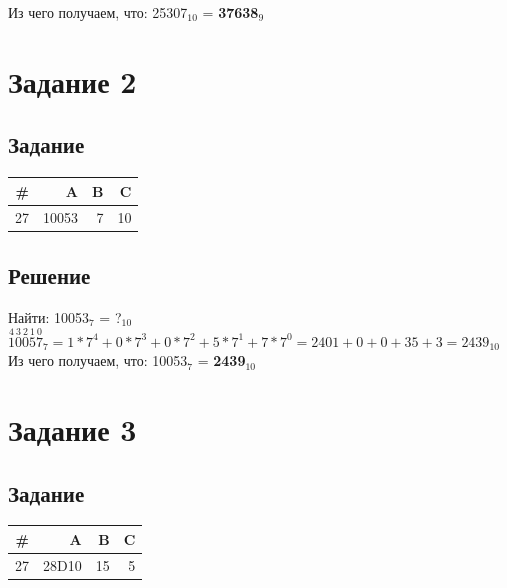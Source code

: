 \documentclass[11pt]{article}
\begin{document}
Из чего получаем, что: 25307\(_{\text{10}}\) = \textbf{37638\(_{\text{9}}\)}

\section{Задание 2}
\label{sec:orgbf80c82}
\subsection{Задание}
\label{sec:orgf47a5b9}
\begin{center}
\begin{tabular}{|r|rrr|}
\hline
\# & A & B & C\\
\hline
27 & 10053 & 7 & 10\\
\hline
\end{tabular}
\end{center}

\subsection{Решение}
\label{sec:org7e3779d}
Найти: 10053\(_{\text{7}}\) = ?\(_{\text{10}}\) \\
\(\overset{4}{1}\overset{3}{0}\overset{2}{0}\overset{1}{5}\overset{0}{7}_7 =
1 * 7^4 + 0 * 7^3 + 0 * 7^2 + 5 * 7^1 + 7 * 7^0 =
2401 + 0 + 0 + 35 + 3 =
2439_{10}\)
Из чего получаем, что: 10053\(_{\text{7}}\) = \textbf{2439\(_{\text{10}}\)}

\section{Задание 3}
\label{sec:orga4d4121}
\subsection{Задание}
\label{sec:org741e4a8}
\begin{center}
\begin{tabular}{|r|rrr|}
\hline
\# & A & B & C\\
\hline
27 & 28D10 & 15 & 5\\
\hline
\end{tabular}
\end{center}
\end{document}
